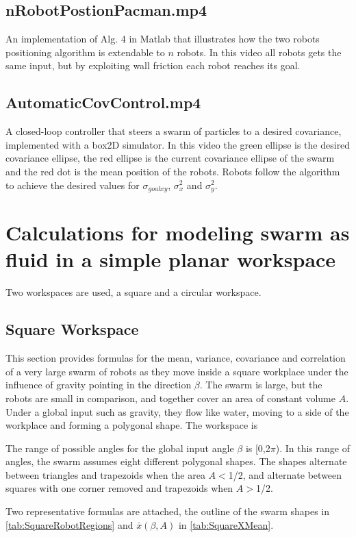 \documentclass[conference]{IEEEtran}
\begin{document}
\subsection{nRobotPostionPacman.mp4}
An implementation of Alg. 4  in {\sc Matlab} that illustrates how the two robots positioning algorithm is extendable to $n$ robots. In this video all  robots gets the same input, but by exploiting wall friction each robot reaches its goal.

\subsection{AutomaticCovControl.mp4}
A closed-loop controller that steers a swarm of particles to a desired covariance,  implemented with a box2D simulator. In this video the green ellipse is the desired covariance ellipse, the red ellipse is the current covariance ellipse of the swarm and the red dot is the mean position of the robots. Robots follow the algorithm to achieve the desired values for $\sigma_{goalxy}$, $\sigma_x^2$ and $\sigma_y^2$.

\section{Calculations for modeling swarm as fluid in a simple planar workspace}
Two workspaces are used, a square and a circular workspace.

\subsection{Square Workspace}
This section provides formulas for the mean, variance,  covariance and correlation of a very large swarm of robots as they move inside a square workplace under the influence of gravity pointing in the direction $\beta$. The swarm is large, but the robots are small in comparison, and together cover an area of constant volume $A$. Under a global input such as gravity, they flow like water, moving to a side of the workplace and forming a polygonal shape. The workspace is 

The range of possible angles for the global input angle $\beta $ is [0,2$\pi $). In this range of angles, the swarm assumes eight different polygonal shapes. The shapes alternate between triangles and trapezoids when the area $A$$<$1/2, and alternate between squares with one corner removed and trapezoids when $A$$>$1/2.

Two representative formulas are attached, the outline of the swarm shapes in \eqref{tab:SquareRobotRegions} and $\bar{x}(\beta,A)$ in \eqref{tab:SquareXMean}.
\end{document}
